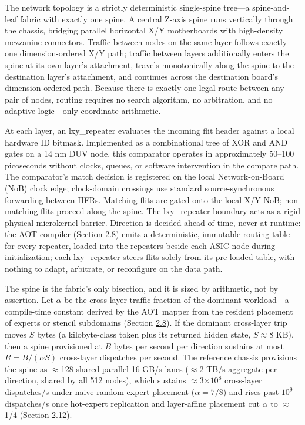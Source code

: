\documentclass[10pt,twocolumn]{article}
\begin{document}
The network topology is a strictly deterministic single-spine tree---a spine-and-leaf fabric with exactly one spine. A central Z-axis spine runs vertically through the chassis, bridging parallel horizontal X/Y motherboards with high-density mezzanine connectors. Traffic between nodes on the same layer follows exactly one dimension-ordered X/Y path; traffic between layers additionally enters the spine at its own layer's attachment, travels monotonically along the spine to the destination layer's attachment, and continues across the destination board's dimension-ordered path. Because there is exactly one legal route between any pair of nodes, routing requires no search algorithm, no arbitration, and no adaptive logic---only coordinate arithmetic.

At each layer, an lxy\_repeater evaluates the incoming flit header against a local hardware ID bitmask. Implemented as a combinational tree of XOR and AND gates on a 14 nm DUV node, this comparator operates in approximately 50--100 picoseconds without clocks, queues, or software intervention in the compare path. The comparator's match decision is registered on the local Network-on-Board (NoB) clock edge; clock-domain crossings use standard source-synchronous forwarding between HFRs. Matching flits are gated onto the local X/Y NoB; non-matching flits proceed along the spine. The lxy\_repeater boundary acts as a rigid physical microkernel barrier\cite{9}. Direction is decided ahead of time, never at runtime: the AOT compiler (Section \hyperref[sec:2.8]{2.8}) emits a deterministic, immutable routing table for every repeater, loaded into the repeaters beside each ASIC node during initialization; each lxy\_repeater steers flits solely from its pre-loaded table, with nothing to adapt, arbitrate, or reconfigure on the data path.

The spine is the fabric's only bisection, and it is sized by arithmetic, not by assertion. Let $\alpha$ be the cross-layer traffic fraction of the dominant workload---a compile-time constant derived by the AOT mapper from the resident placement of experts or stencil subdomains (Section \hyperref[sec:2.8]{2.8}). If the dominant cross-layer trip moves $S$ bytes (a kilobyte-class token plus its returned hidden state, $S \approx 8$ KB), then a spine provisioned at $B$ bytes per second per direction sustains at most $R = B / (\alpha S)$ cross-layer dispatches per second. The reference chassis provisions the spine as $\approx$128 shared parallel 16 GB/s lanes ($\approx$2 TB/s aggregate per direction, shared by all 512 nodes), which sustains $\approx$3$\times10^{8}$ cross-layer dispatches/s under naive random expert placement ($\alpha = 7/8$) and rises past $10^{9}$ dispatches/s once hot-expert replication and layer-affine placement cut $\alpha$ to $\approx$1/4 (Section \hyperref[sec:2.12]{2.12}).
\end{document}
